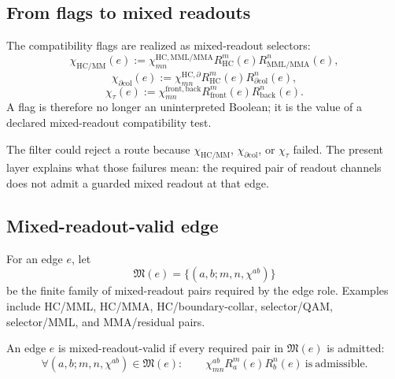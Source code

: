 \subsection{From flags to mixed readouts}
\label{subsec:v410r18-from-r16-flags-to-mixed-readouts}

\begin{definition}
\label{def:v410r18-flag-to-readout-realization}
The compatibility flags are realized as mixed-readout selectors:
\[
 \chi_{\mathrm{HC/MM}}(e)
 :=
 \chi^{\mathrm{HC},\mathrm{MML/MMA}}_{mn}
 R_{\mathrm{HC}}^m(e)R_{\mathrm{MML/MMA}}^n(e),
\]
\[
 \chi_{\partial\mathrm{col}}(e)
 :=
 \chi^{\mathrm{HC},\partial}_{mn}
 R_{\mathrm{HC}}^m(e)R_{\partial\mathrm{col}}^n(e),
\]
\[
 \chi_{\tau}(e)
 :=
 \chi^{\mathrm{front},\mathrm{back}}_{mn}
 R_{\mathrm{front}}^m(e)R_{\mathrm{back}}^n(e).
\]
A flag is therefore no longer an uninterpreted Boolean; it is the value of a
declared mixed-readout compatibility test.
\end{definition}

\begin{remark}
\label{rem:v410r18-why-this-matters}
The filter could reject a route because \(\chi_{\mathrm{HC/MM}}\),
\(\chi_{\partial\mathrm{col}}\), or \(\chi_{\tau}\) failed. The present layer
explains what those failures mean: the required pair of readout channels does
not admit a guarded mixed readout at that edge.
\end{remark}

\subsection{Mixed-readout-valid edge}
\label{subsec:v410r18-mixed-readout-valid-edge}

\begin{definition}
\label{def:v410r18-required-mixed-readout-set}
For an edge \(e\), let
\[
 \mathfrak M(e)
 =
 \{(a,b;m,n,\chi^{ab})\}
\]
be the finite family of mixed-readout pairs required by the edge role. Examples
include HC/MML, HC/MMA, HC/boundary-collar, selector/QAM, selector/MML, and
MMA/residual pairs.
\end{definition}

\begin{definition}
\label{def:v410r18-mixed-readout-valid-edge}
An edge \(e\) is mixed-readout-valid if every required pair in
\(\mathfrak M(e)\) is admitted:
\[
 \forall (a,b;m,n,\chi^{ab})\in\mathfrak M(e):
 \qquad
 \chi^{ab}_{mn}R_a^m(e)R_b^n(e)\ \mathrm{is\ admissible}.
\]
\end{definition}

